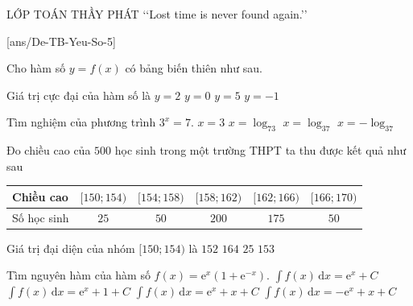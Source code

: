 \begin{name}
	{\tenchude}
	{\tendethi}
	{LỚP TOÁN THẦY PHÁT}
	{\lq\lq Lost time is never found again.\rq\rq}
\end{name}

[ans/De-TB-Yeu-So-5]
\TN
\begin{ex}%
	Cho hàm số $y=f(x)$ có bảng biến thiên như sau.
	\begin{center}
	\end{center}
	Giá trị cực đại của hàm số là
	\choice
	{$y=2$}
	{$y=0$}
	{\True $y=5$}
	{$y=-1$}
\end{ex}

\begin{ex}%
	Tìm nghiệm của phương trình $3^x=7$.
	\choice
	{$x=3$}
	{$x=\log _73$}
	{\True $x=\log _37$}
	{$x=-\log _37$}
\end{ex}

\begin{ex}%
	Đo chiều cao của $500$ học sinh trong một trường THPT ta thu được kết quả như sau
	\begin{longtable}{|l|c|c|c|c|c|}
		\hline
		Chiều cao & $[150;154)$ & $[154;158)$ & $[158;162)$ & $[162;166)$ & $[166;170)$ \\
		\hline
		Số học sinh & $25$ & $50$ & $200$ & $175$ & $50$ \\
		\hline
	\end{longtable}
	Giá trị đại diện của nhóm $[150;154)$ là
	\choice
	{\True $152$}
	{$164$}
	{$25$}
	{$153$}
	\loigiai{
		Nhóm $[150;154)$ có giá trị đại diện là $\dfrac{150+154}{2}=152$.
	}
\end{ex}

\begin{ex}%
	Tìm nguyên hàm của hàm số $f(x)=\mathrm{e}^x(1+\mathrm{e}^{-x})$.
	\choice
	{$\displaystyle\int f(x)\mathrm{\,d}x=\mathrm{e}^x+C$}
	{$\displaystyle\int f(x)\mathrm{\,d}x=\mathrm{e}^x+1+C$}
	{\True $\displaystyle\int f(x)\mathrm{\,d}x=\mathrm{e}^x+x+C$}
	{$\displaystyle\int f(x)\mathrm{\,d}x=-\mathrm{e}^x+x+C$}
\end{ex}

